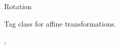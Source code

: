 \begin{ccRefClass}{Rotation}

\ccDefinition
Tag class for affine transformations.

\ccSeeAlso
{}, 
\end{ccRefClass}
